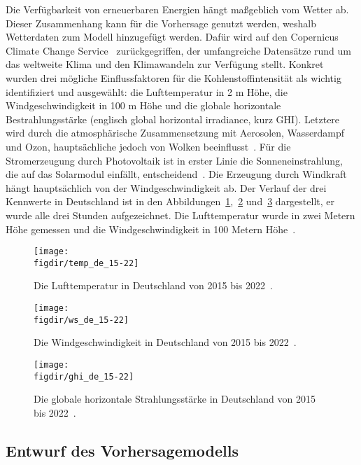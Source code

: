 Die Verfügbarkeit von erneuerbaren Energien hängt maßgeblich vom Wetter ab.
Dieser Zusammenhang kann für die Vorhersage genutzt werden, weshalb Wetterdaten zum Modell hinzugefügt werden.
Dafür wird auf den Copernicus Climate Change Service~\cite{Copernicus.20231212T14:09:40.000Z} zurückgegriffen, der umfangreiche Datensätze rund um das weltweite Klima und den Klimawandeln zur Verfügung stellt.
Konkret wurden drei mögliche Einflussfaktoren für die Kohlenstoffintensität als wichtig identifiziert und ausgewählt: die Lufttemperatur in 2 m Höhe, die Windgeschwindigkeit in 100 m Höhe und die globale horizontale Bestrahlungsstärke (englisch global horizontal irradiance, kurz GHI).
Letztere wird durch die atmosphärische Zusammensetzung mit Aerosolen, Wasserdampf und Ozon, hauptsächliche jedoch von Wolken beeinflusst~\cite{KallioMyers.2020}.
Für die Stromerzeugung durch Photovoltaik ist in erster Linie die Sonneneinstrahlung, die auf das Solarmodul einfällt, entscheidend~\cite{James.}.
Die Erzeugung durch Windkraft hängt hauptsächlich von der Windgeschwindigkeit ab.
Der Verlauf der drei Kennwerte in Deutschland ist in den Abbildungen~\ref{FIG:temp_de_2015-2022},~\ref{FIG:ws_de_2015-2022} und~\ref{FIG:ghi_de_2015-2022} dargestellt, er wurde alle drei Stunden aufgezeichnet.
Die Lufttemperatur wurde in zwei Metern Höhe gemessen und die Windgeschwindigkeit in 100 Metern Höhe~\cite{Copernicus.20231212T14:09:40.000Z}.
\begin{figure}
 \caption{Die Lufttemperatur in Deutschland von 2015 bis 2022~\cite{Copernicus.20231212T14:09:40.000Z}.}
 {\texttt{[image: \\figdir/temp\_de\_15-22]}}
 \label{FIG:temp_de_2015-2022}
\end{figure}
\begin{figure}
 \caption{Die Windgeschwindigkeit in Deutschland von 2015 bis 2022~\cite{Copernicus.20231212T14:09:40.000Z}.}
 {\texttt{[image: \\figdir/ws\_de\_15-22]}}
 \label{FIG:ws_de_2015-2022}
\end{figure}
\begin{figure}
 \caption{Die globale horizontale Strahlungsstärke in Deutschland von 2015 bis 2022~\cite{Copernicus.20231212T14:09:40.000Z}.}
 {\texttt{[image: \\figdir/ghi\_de\_15-22]}}
 \label{FIG:ghi_de_2015-2022}
\end{figure}

\subsection{Entwurf des Vorhersagemodells}
